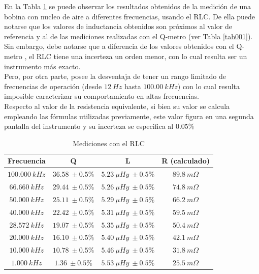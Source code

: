 \documentclass[a4paper,10pt]{article}
\begin{document}
		\indent En la Tabla \ref{tabRLCbobina} se puede observar los resultados 
		obtenidos de la medici\'on de una bobina con nucleo de aire a diferentes
		frecuencias, usando el RLC. De ella puede notarse que los valores de 
		inductancia obtenidos son pr\'oximos al valor de referencia y al de las 
		mediciones realizadas con el Q-metro (ver Tabla \ref{tab001}). Sin 
		embargo, debe notarse que a diferencia de los valores obtenidos con el 
		Q-metro , el RLC tiene una incerteza un orden menor, con lo cual resulta
		ser un instrumento m\'as exacto. \\
		\indent Pero, por otra parte, posee la desventaja de tener un rango 
		limitado de frecuencias de operaci\'on (desde $12~Hz$ hasta 
		$100.00~kHz$) con lo cual resulta imposible caracterizar su 
		comportamiento en altas frecuencias. \\
		\indent Respecto al valor de la resistencia equivalente, si bien su 
		valor se calcula empleando las f\'ormulas utilizadas previamente, este 
		valor figura en una segunda pantalla del instrumento y su incerteza se 
		especifica al $0.05\%$
		\begin{table}[!htp]
			\centering
			\begin{tabular}{|c|c|c|c|}
				\hline
				Frecuencia & Q & L  & R (calculado) \\
				\hline
				$100.000~kHz$& $36.58~\pm0.5\%$ & $5.23~\mu Hy~\pm0.5\%$ &
				$ 89.8~m\Omega$ \\
				\hline
				$66.660~kHz$& $29.44~\pm0.5\%$ & $5.26~\mu Hy~\pm0.5\%$ &
				$ 74.8~m\Omega$ \\
				\hline
				$50.000~kHz$& $25.11~\pm0.5\%$ & $5.29~\mu Hy~\pm0.5\%$ &
				$ 66.2~m\Omega$ \\
				\hline  
				$40.000~kHz$& $22.42~\pm0.5\%$ & $5.31~\mu Hy~\pm0.5\%$ &
				$ 59.5~m\Omega$ \\
				\hline  										
				$28.572~kHz$& $19.07~\pm0.5\%$ & $5.35~\mu Hy~\pm0.5\%$ &
				$ 50.4~m\Omega$ \\
				\hline
				$20.000~kHz$& $16.10~\pm0.5\%$ & $5.40~\mu Hy~\pm0.5\%$ &
				$ 42.1~m\Omega$ \\
				\hline  
				$10.000~kHz$& $10.78~\pm0.5\%$ & $5.46~\mu Hy~\pm0.5\%$ &
				$ 31.8~m\Omega$ \\
				\hline 										
				$1.000~kHz$& $1.36~\pm0.5\%$ & $5.53~\mu Hy~\pm0.5\%$ &
				$ 25.5~m\Omega$ \\
				\hline 	  
			\end{tabular}
			\caption{Mediciones con el RLC} \label{tabRLCbobina}
		\end{table}
				
\end{document}
